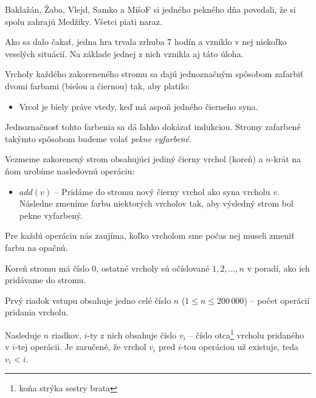 

\usepackage[slovak]{babel}





Baklažán, Žaba, Vlejd, Samko a MišoF si jedného pekného dňa povedali,
že si spolu zahrajú Medžiky. Všetci piati naraz.

Ako sa dalo čakať, jedna hra trvala zrhuba 7 hodín a vzniklo v nej niekoľko
veselých situácií. Na základe jednej z nich vznikla aj táto úloha.


Vrcholy každého zakoreneného stromu sa dajú jednoznačným spôsobom zafarbiť dvomi
farbami (bielou a čiernou) tak, aby platilo:

\begin{itemize}
\item Vrcol je biely práve vtedy, keď má aspoň jedného čierneho syna.
\end{itemize}

Jednoznačnosť tohto farbenia sa dá ľahko dokázať indukciou. Stromy zafarbené takýmto
spôsobom budeme volať \emph{pekne vyfarbené}.

Vezmeme zakorenený strom obsahujúci jediný čierny vrchol (koreň) a $n$-krát na
ňom urobíme nasledovnú operáciu:

\begin{itemize}
\item $add(v)$ -- Pridáme do stromu nový čierny vrchol ako syna vrcholu $v$. Následne zmeníme farbu
                  niektorých vrcholov tak, aby výsledný strom bol pekne vyfarbený.
\end{itemize}

Pre každú operáciu nás zaujíma, koľko vrcholom sme počas nej museli zmeniť farbu na opačnú.


Koreň stromu má číslo $0$, ostatné vrcholy sú očíslované $1, 2, \dots, n$ v poradí, ako ich
pridávame do stromu.

Prvý riadok vstupu obsahuje jedno celé číslo $n$ ($1 \leq n \leq 200\,000$) -- počet operácií
pridania vrcholu.

Nasleduje $n$ riadkov, $i$-ty z nich obsahuje číslo $v_i$ -- číslo otca\footnote{koňa strýka sestry brata} vrcholu pridaného v $i$-tej operácii. Je zaručené, že vrchol $v_i$ pred $i$-tou operáciou
už existuje, teda $v_i < i$.

